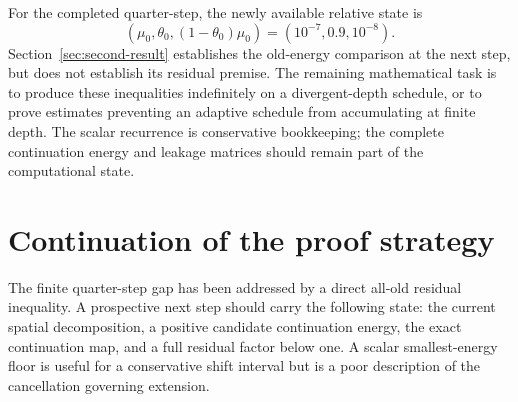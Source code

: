 \documentclass[11pt]{article}
\theoremstyle{remark}\newtheorem{remark}[theorem]{Remark}
\begin{document}
For the completed quarter-step, the newly available relative state is
\[
 (\mu_0,\theta_0,(1-\theta_0)\mu_0)
       =(10^{-7},0.9,10^{-8}).
\]
Section~\ref{sec:second-result} establishes the old-energy comparison at the next step, but does not establish its residual premise.
The remaining mathematical task is to produce these inequalities indefinitely
on a divergent-depth schedule, or to prove estimates preventing an adaptive
schedule from accumulating at finite depth. The scalar recurrence is
conservative bookkeeping; the complete continuation energy and leakage
matrices should remain part of the computational state.



\section{Continuation of the proof strategy}\label{sec:next}

The finite quarter-step gap has been addressed by a direct all-old residual inequality. A prospective next step should carry the following state: the current spatial decomposition, a positive candidate continuation energy, the exact continuation map, and a full residual factor below one. A scalar smallest-energy floor is useful for a conservative shift interval but is a poor description of the cancellation governing extension.
\end{document}
